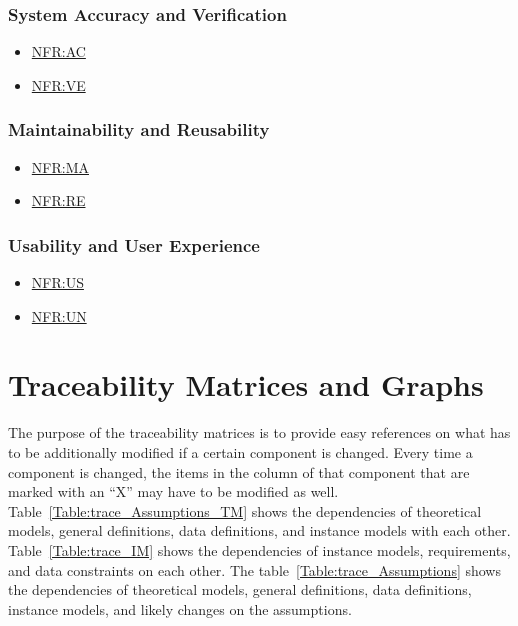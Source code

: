 \documentclass[12pt]{article}
\newcommand{\hpref}[1]{\hyperref[#1]{#1}}
\begin{document}
  \subsubsection{System Accuracy and Verification}
  \label{subsec:System Accuracy and Verification}
  \begin{itemize}
      \item \hpref{NFR:AC}
      \item \hpref{NFR:VE}
  \end{itemize}
  
  \subsubsection{Maintainability and Reusability}
  \label{subsec:Maintainability and Reusability}
  \begin{itemize}
      \item \hpref{NFR:MA}
      \item \hpref{NFR:RE} 
  \end{itemize}

  \subsubsection{Usability and User Experience}
  \label{subsec:Usability and User Experience}
  \begin{itemize}
      \item \hpref{NFR:US}
      \item \hpref{NFR:UN}
  \end{itemize}
  
\section{Traceability Matrices and Graphs}

The purpose of the traceability matrices is to provide easy references on what
has to be additionally modified if a certain component is changed.  Every time a
component is changed, the items in the column of that component that are marked
with an ``X'' may have to be modified as well.  Table~\ref{Table:trace_Assumptions_TM} shows the
dependencies of theoretical models, general definitions, data definitions, and
instance models with each other. Table~\ref{Table:trace_IM} shows the
dependencies of instance models, requirements, and data constraints on each
other. The table~\ref{Table:trace_Assumptions} shows the dependencies of theoretical models,
general definitions, data definitions, instance models, and likely changes on
the assumptions.
\clearpage
\FloatBarrier
\end{document}
